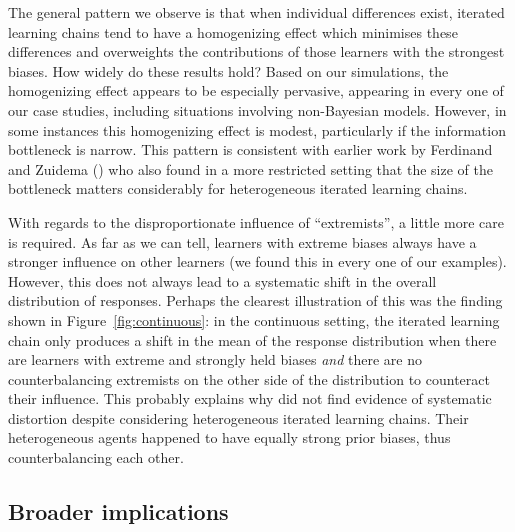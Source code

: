 \documentclass[doc]{apa6}
\begin{document}
The general pattern we observe is that when individual differences exist, iterated learning chains tend to have a homogenizing effect which minimises these differences and overweights the contributions of those learners with the strongest biases. How widely do these results hold? Based on our simulations, the homogenizing effect appears to be especially pervasive, appearing in every one of our case studies, including situations involving non-Bayesian models. However, in some instances this homogenizing effect is modest, particularly if the information bottleneck is narrow. This pattern is consistent with earlier work by Ferdinand and Zuidema (\citeyear{ferdinand2009thomas,ferdinand2008language}) who also found in a more restricted setting that the size of the bottleneck matters considerably for heterogeneous iterated learning chains.

With regards to the disproportionate influence of ``extremists'', a little more care is required. As far as we can tell, learners with extreme biases always have a stronger influence on other learners (we found this in every one of our examples). However, this does not always lead to a systematic shift in the overall distribution of responses. Perhaps the clearest illustration of this was the finding shown in Figure~\ref{fig:continuous}: in the continuous setting, the iterated learning chain only produces a shift in the mean of the response distribution when there are learners with extreme and strongly held biases {\it and} there are no counterbalancing extremists on the other side of the distribution to counteract their influence. This probably explains why \textcite{ferdinand2008language,ferdinand2009thomas} did not find evidence of systematic distortion despite considering heterogeneous iterated learning chains. Their heterogeneous agents happened to have equally strong prior biases, thus counterbalancing each other.



\subsection{Broader implications}
\end{document}
